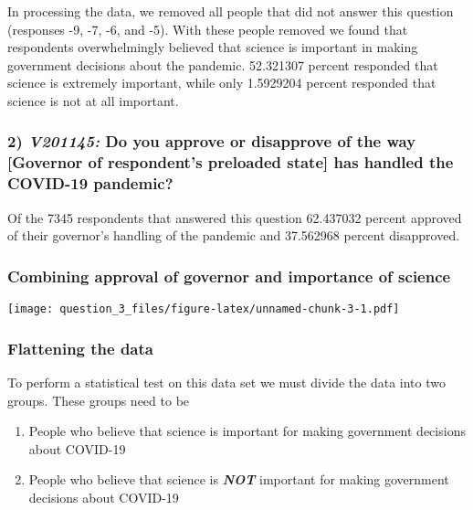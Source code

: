 \documentclass[
]{article}
\providecommand{\tightlist}{%
  \setlength{\itemsep}{0pt}\setlength{\parskip}{0pt}}
\begin{document}
In processing the data, we removed all people that did not answer this
question (responses -9, -7, -6, and -5). With these people removed we
found that respondents overwhelmingly believed that science is important
in making government decisions about the pandemic. 52.321307 percent
responded that science is extremely important, while only 1.5929204
percent responded that science is not at all important.

\hypertarget{v201145-do-you-approve-or-disapprove-of-the-way-governor-of-respondents-preloaded-state-has-handled-the-covid-19-pandemic}{%
\subsubsection{\texorpdfstring{2) \emph{V201145:} Do you approve or
disapprove of the way {[}Governor of respondent's preloaded state{]} has
handled the COVID-19
pandemic?}{2) V201145: Do you approve or disapprove of the way {[}Governor of respondent's preloaded state{]} has handled the COVID-19 pandemic?}}\label{v201145-do-you-approve-or-disapprove-of-the-way-governor-of-respondents-preloaded-state-has-handled-the-covid-19-pandemic}}

Of the 7345 respondents that answered this question 62.437032 percent
approved of their governor's handling of the pandemic and 37.562968
percent disapproved.

\hypertarget{combining-approval-of-governor-and-importance-of-science}{%
\subsubsection{Combining approval of governor and importance of
science}\label{combining-approval-of-governor-and-importance-of-science}}

\texttt{[image: question\_3\_files/figure-latex/unnamed-chunk-3-1.pdf]}

\hypertarget{flattening-the-data}{%
\subsubsection{Flattening the data}\label{flattening-the-data}}

To perform a statistical test on this data set we must divide the data
into two groups. These groups need to be

\begin{enumerate}
\def\labelenumi{\arabic{enumi})}
\tightlist
\item
  People who believe that science is important for making government
  decisions about COVID-19
\item
  People who believe that science is \textbf{\emph{NOT}} important for
  making government decisions about COVID-19
\end{enumerate}
\end{document}
